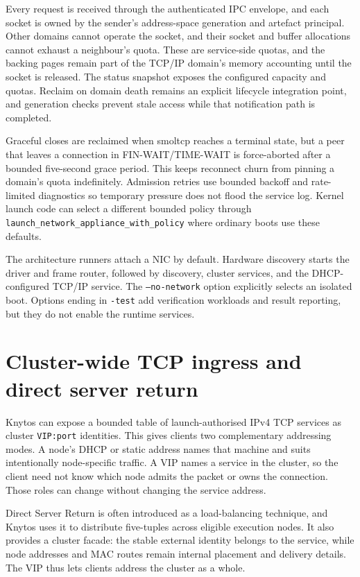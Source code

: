 Every request is received through the
authenticated IPC envelope, and each socket is owned by the sender's
address-space generation and artefact principal. Other domains cannot operate
the socket, and their socket and buffer allocations cannot exhaust a neighbour's
quota. These are service-side quotas, and the backing pages remain part of the
TCP/IP domain's memory accounting until the socket is released. The status
snapshot exposes the configured capacity and quotas. Reclaim on domain death
remains an explicit lifecycle integration point, and generation checks prevent
stale access while that notification path is completed.

Graceful closes are reclaimed when smoltcp reaches a terminal state, but a peer
that leaves a connection in FIN-WAIT/TIME-WAIT is force-aborted after a bounded
five-second grace period. This keeps reconnect churn from pinning a domain's
quota indefinitely. Admission retries use bounded backoff and rate-limited
diagnostics so temporary pressure does not flood the service log.
Kernel launch code can select a different bounded policy through
\texttt{launch\_network\_appliance\_with\_policy} where ordinary boots use these
defaults.

The architecture runners attach a NIC by default. Hardware discovery starts
the driver and frame router, followed by discovery, cluster services, and the
DHCP-configured TCP/IP service. The \texttt{--no-network} option explicitly
selects an isolated boot. Options ending in \texttt{-test} add verification
workloads and result reporting, but they do not enable the runtime services.

\section{Cluster-wide TCP ingress and direct server return}
\label{sec:distributed-l2-ingress}

Knytos can expose a bounded table of launch-authorised IPv4 TCP services as
cluster \texttt{VIP:port} identities. This gives clients two complementary
addressing modes. A node's DHCP or static address names that machine and suits
intentionally node-specific traffic. A VIP names a service in the cluster, so
the client need not know which node admits the packet or owns the connection.
Those roles can change without changing the service address.

Direct Server Return is often introduced as a load-balancing technique, and
Knytos uses it to distribute five-tuples across eligible execution nodes.
It also provides a cluster facade: the stable external identity belongs to the
service, while node addresses and MAC routes remain internal placement and
delivery details. The VIP thus lets clients address the cluster as a whole.

